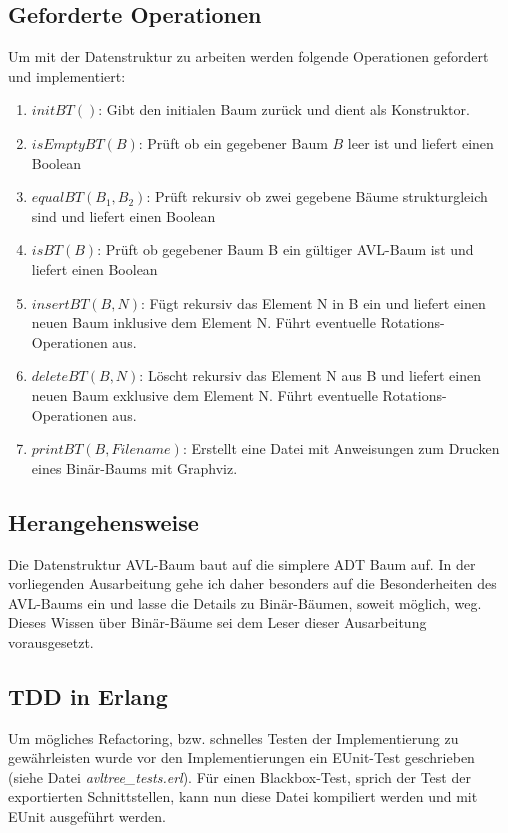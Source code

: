 \documentclass{article}
\begin{document}
	\subsection{Geforderte Operationen}
	
	Um mit der Datenstruktur zu arbeiten werden folgende Operationen gefordert und implementiert:
	
	\begin{enumerate}
		\item $initBT()$: Gibt den initialen Baum zurück und dient als Konstruktor.
		\item $isEmptyBT(B)$: Prüft ob ein gegebener Baum $B$ leer ist und liefert einen Boolean
		\item $equalBT(B_1, B_2)$: Prüft rekursiv ob zwei gegebene Bäume strukturgleich sind und liefert einen Boolean
		\item $isBT(B)$: Prüft ob gegebener Baum B ein gültiger AVL-Baum ist und liefert einen Boolean
		\item $insertBT(B, N)$: Fügt rekursiv das Element N in B ein und liefert einen neuen Baum inklusive dem Element N. Führt eventuelle Rotations-Operationen aus.
		\item $deleteBT(B, N)$: Löscht rekursiv das Element N aus B und liefert einen neuen Baum exklusive dem Element N. Führt eventuelle Rotations-Operationen aus.
		\item $printBT(B, Filename)$: Erstellt eine Datei mit Anweisungen zum Drucken eines Binär-Baums mit Graphviz. 
	\end{enumerate}
	
	\subsection{Herangehensweise}
	
	Die Datenstruktur AVL-Baum baut auf die simplere ADT Baum auf. In der vorliegenden Ausarbeitung gehe ich daher besonders auf die Besonderheiten des AVL-Baums ein und lasse die Details zu Binär-Bäumen, soweit möglich, weg. Dieses Wissen über Binär-Bäume sei dem Leser dieser Ausarbeitung vorausgesetzt.

  
  \subsection{TDD in Erlang}
  
  Um mögliches Refactoring, bzw. schnelles Testen der Implementierung zu gewährleisten wurde vor den Implementierungen ein EUnit-Test geschrieben (siehe Datei \textit{avltree\_tests.erl}). Für einen Blackbox-Test, sprich der Test der exportierten Schnittstellen, kann nun diese Datei kompiliert werden und mit EUnit ausgeführt werden.
  
\end{document}
